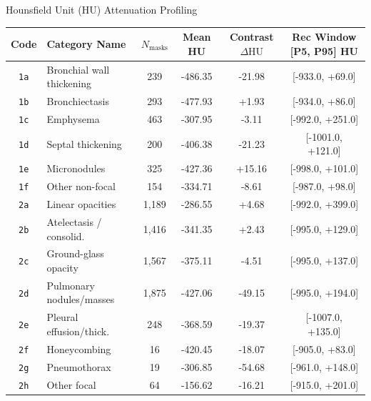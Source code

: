 \documentclass[aspectratio=169, 10pt]{beamer}
\begin{document}
\begin{frame}{Hounsfield Unit (HU) Attenuation Profiling}
    \centering
    \scriptsize
    \setlength{\tabcolsep}{7pt}
    \begin{tabular}{clcccc}
        \toprule
        \textbf{Code} & \textbf{Category Name} & \textbf{$N_{\text{masks}}$} & \textbf{Mean HU} & \textbf{Contrast $\Delta \text{HU}$} & \textbf{Rec Window [P5, P95] HU} \\
        \midrule
        \texttt{1a} & Bronchial wall thickening & 239 & -486.35 & -21.98 & [-933.0, +69.0] \\
        \texttt{1b} & Bronchiectasis           & 293 & -477.93 & +1.93  & [-934.0, +86.0] \\
        \texttt{1c} & Emphysema                & 463 & -307.95 & -3.11  & [-992.0, +251.0] \\
        \texttt{1d} & Septal thickening        & 200 & -406.38 & -21.23 & [-1001.0, +121.0] \\
        \texttt{1e} & Micronodules             & 325 & -427.36 & +15.16 & [-998.0, +101.0] \\
        \texttt{1f} & Other non-focal          & 154 & -334.71 & -8.61  & [-987.0, +98.0] \\
        \texttt{2a} & Linear opacities         & 1,189 & -286.55 & +4.68 & [-992.0, +399.0] \\
        \texttt{2b} & Atelectasis / consolid.  & 1,416 & -341.35 & +2.43 & [-995.0, +129.0] \\
        \texttt{2c} & Ground-glass opacity     & 1,567 & -375.11 & -4.51 & [-995.0, +137.0] \\
        \rowcolor{darkblue!10}
        \texttt{2d} & Pulmonary nodules/masses & 1,875 & -427.06 & -49.15 & [-995.0, +194.0] \\
        \texttt{2e} & Pleural effusion/thick.  & 248 & -368.59 & -19.37 & [-1007.0, +135.0] \\
        \texttt{2f} & Honeycombing             & 16  & -420.45 & -18.07 & [-905.0, +83.0] \\
        \texttt{2g} & Pneumothorax             & 19  & -306.85 & -54.68 & [-961.0, +148.0] \\
        \rowcolor{darkblue!10}
        \texttt{2h} & Other focal              & 64  & -156.62 & -16.21 & [-915.0, +201.0] \\
        \bottomrule
    \end{tabular}


\end{frame}
\end{document}
